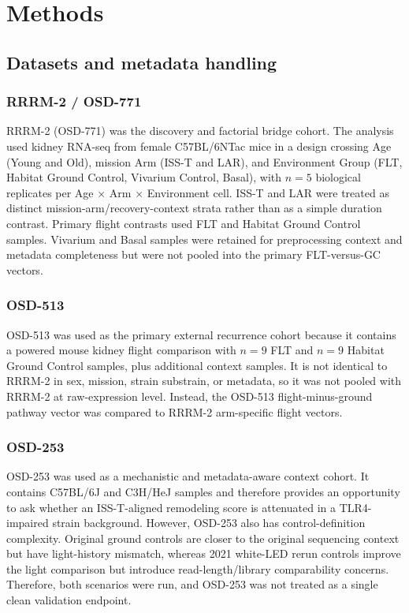 \documentclass[11pt]{article}
\begin{document}
\section{Methods}

\subsection{Datasets and metadata handling}

\subsubsection{RRRM-2 / OSD-771}

RRRM-2 (OSD-771) was the discovery and factorial bridge cohort. The analysis used kidney RNA-seq from female C57BL/6NTac mice in a design crossing Age (Young and Old), mission Arm (ISS-T and LAR), and Environment Group (FLT, Habitat Ground Control, Vivarium Control, Basal), with $n=5$ biological replicates per Age $\times$ Arm $\times$ Environment cell. ISS-T and LAR were treated as distinct mission-arm/recovery-context strata rather than as a simple duration contrast. Primary flight contrasts used FLT and Habitat Ground Control samples. Vivarium and Basal samples were retained for preprocessing context and metadata completeness but were not pooled into the primary FLT-versus-GC vectors.

\subsubsection{OSD-513}

OSD-513 was used as the primary external recurrence cohort because it contains a powered mouse kidney flight comparison with $n=9$ FLT and $n=9$ Habitat Ground Control samples, plus additional context samples. It is not identical to RRRM-2 in sex, mission, strain substrain, or metadata, so it was not pooled with RRRM-2 at raw-expression level. Instead, the OSD-513 flight-minus-ground pathway vector was compared to RRRM-2 arm-specific flight vectors.

\subsubsection{OSD-253}

OSD-253 was used as a mechanistic and metadata-aware context cohort. It contains C57BL/6J and C3H/HeJ samples and therefore provides an opportunity to ask whether an ISS-T-aligned remodeling score is attenuated in a TLR4-impaired strain background. However, OSD-253 also has control-definition complexity. Original ground controls are closer to the original sequencing context but have light-history mismatch, whereas 2021 white-LED rerun controls improve the light comparison but introduce read-length/library comparability concerns. Therefore, both scenarios were run, and OSD-253 was not treated as a single clean validation endpoint.
\end{document}

